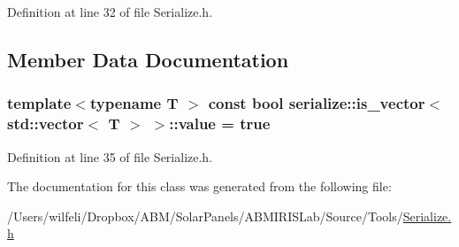 Definition at line 32 of file Serialize.\+h.



\subsection{Member Data Documentation}
\hypertarget{classserialize_1_1is__vector_3_01std_1_1vector_3_01_t_01_4_01_4_ab331b67d5bf759246c7998eb63d341ec}{}
\subsubsection[{value}]{\setlength{\rightskip}{0pt plus 5cm}template$<$typename T $>$ const bool {\bf serialize\+::is\+\_\+vector}$<$ std\+::vector$<$ T $>$ $>$\+::value = true\hspace{0.3cm}{\ttfamily [static]}}\label{classserialize_1_1is__vector_3_01std_1_1vector_3_01_t_01_4_01_4_ab331b67d5bf759246c7998eb63d341ec}


Definition at line 35 of file Serialize.\+h.



The documentation for this class was generated from the following file\+:\begin{DoxyCompactItemize}
\item 
/\+Users/wilfeli/\+Dropbox/\+A\+B\+M/\+Solar\+Panels/\+A\+B\+M\+I\+R\+I\+S\+Lab/\+Source/\+Tools/\hyperlink{_serialize_8h}{Serialize.\+h}\end{DoxyCompactItemize}
